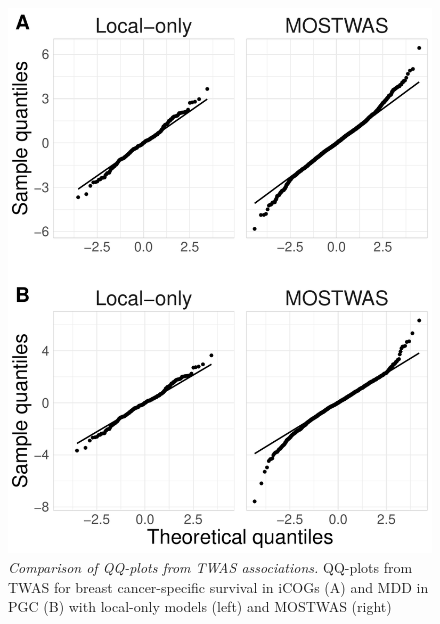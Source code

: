 \documentclass[11pt]{article}
\begin{document}
\begin{center}
\begin{figure}[!h]
\centering
    \includegraphics[width=.8\textwidth]{figures/ch4_suppfig3.pdf}
    \caption{\emph{Comparison of QQ-plots
    from TWAS associations.} QQ-plots
    from TWAS for breast 
    cancer-specific survival in iCOGs (A) 
    and MDD in PGC (B)
    with local-only models (left)
    and MOSTWAS (right)}
    \label{fig:ch4_suppfig3}
\end{figure}
\end{center}


\pagebreak
\end{document}
